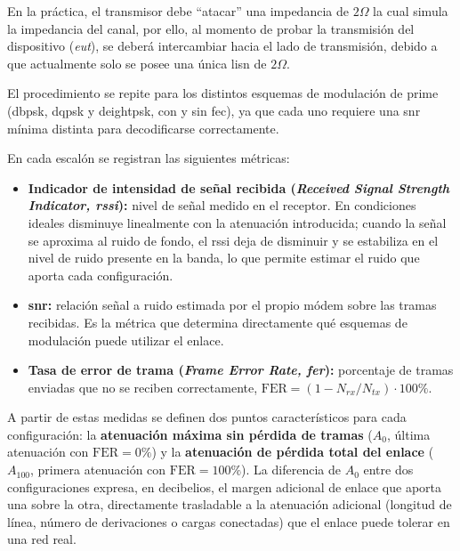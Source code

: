 En la práctica, el transmisor debe ``atacar'' una impedancia de $2\Omega$ la cual simula la impedancia del canal, por ello, al momento de probar la transmisión del dispositivo (\textit{\gls{eut}}), se deberá intercambiar hacia el lado de transmisión, debido a que actualmente solo se posee una única \gls{lisn} de $2\Omega$. 

El procedimiento se repite para los distintos esquemas de modulación de \gls{prime} (\gls{dbpsk}, \gls{dqpsk} y \gls{deightpsk}, con y sin \gls{fec}), ya que cada uno requiere una \gls{snr} mínima distinta para decodificarse correctamente.

En cada escalón se registran las siguientes métricas:

\begin{itemize}
    \item \textbf{Indicador de intensidad de señal recibida (\textit{Received Signal Strength Indicator, \gls{rssi}}):} nivel de señal medido en el receptor. En condiciones ideales disminuye linealmente con la atenuación introducida; cuando la señal se aproxima al ruido de fondo, el \gls{rssi} deja de disminuir y se estabiliza en el nivel de ruido presente en la banda, lo que permite estimar el ruido que aporta cada configuración.
    \item \textbf{\gls{snr}:} relación señal a ruido estimada por el propio módem sobre las tramas recibidas. Es la métrica que determina directamente qué esquemas de modulación puede utilizar el enlace.
    \item \textbf{Tasa de error de trama (\textit{Frame Error Rate, \gls{fer}}):} porcentaje de tramas enviadas que no se reciben correctamente, $\text{FER} = \left(1 - N_{rx}/N_{tx}\right) \cdot 100\%$.
\end{itemize}

A partir de estas medidas se definen dos puntos característicos para cada configuración: la \textbf{atenuación máxima sin pérdida de tramas} ($A_{0}$, última atenuación con $\text{FER} = 0\%$) y la \textbf{atenuación de pérdida total del enlace} ($A_{100}$, primera atenuación con $\text{FER} = 100\%$). La diferencia de $A_{0}$ entre dos configuraciones expresa, en decibelios, el margen adicional de enlace que aporta una sobre la otra, directamente trasladable a la atenuación adicional (longitud de línea, número de derivaciones o cargas conectadas) que el enlace puede tolerar en una red real.

